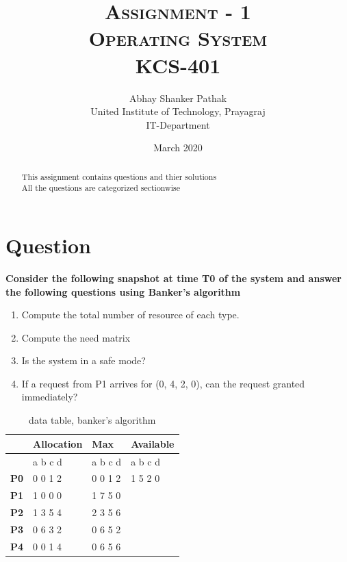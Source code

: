 \documentclass[11pt,a4paper,oneside]{article}
\title{\textsc{Assignment - 1\\Operating System\\KCS-401}}
\author{Abhay Shanker Pathak\\United Institute of Technology, Prayagraj\\IT-Department}
\date{March 2020}
\begin{document}
\maketitle
\setlength{\parindent}{1cm}

\renewcommand{\abstractname}{About}
\begin{abstract}
	\centering
	\large{This assignment contains questions and thier solutions\\
	All the questions are categorized sectionwise}
\end{abstract}

\tableofcontents
\listoftables
\listoffigures
\clearpage


\section{Question}
\bgroup \bfseries
\noindent Consider the following snapshot at time T0 of the system and answer the following questions using Banker's algorithm
\begin{enumerate}
		\item Compute the total number of resource of each type.
		\item Compute the need matrix
		\item Is the system in a safe mode?
		\item If a request from P1 arrives for (0, 4, 2, 0), can the request granted immediately?
\end{enumerate}
\egroup{}

\begin{center}
	\begin{table}[h]
		\begin{tabular}{ ||>{\bfseries} m{7em} || m{7em} || m{7em} || m{7em} ||}
			\hline
			& \textbf{Allocation} & \textbf{Max} & \textbf{Available} \\
			\hline
			& a b c d & a b c d & a b c d \\
			\hline
			P0 & 0 0 1 2 & 0 0 1 2 & 1 5 2 0 \\
			\hline
			P1 & 1 0 0 0 & 1 7 5 0 & \\
			\hline
			P2 & 1 3 5 4 & 2 3 5 6 & \\
			\hline
			P3 & 0 6 3 2 & 0 6 5 2 & \\
			\hline
			P4 & 0 0 1 4 & 0 6 5 6 & \\
			\hline
		\end{tabular}
		\caption{data table, banker's algorithm}
	\end{table}
\end{center}
\end{document}
